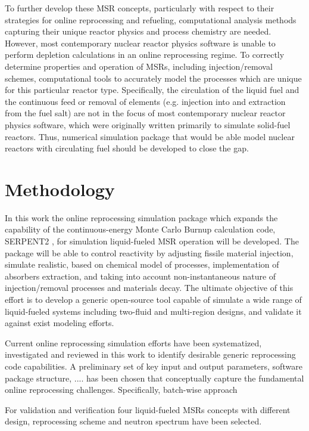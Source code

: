 To further develop these \gls{MSR} concepts, particularly with respect to their  
strategies for online reprocessing and refueling, computational analysis methods capturing their unique reactor physics and process chemistry are needed.
However, most contemporary nuclear reactor physics software is unable to 
perform depletion calculations in an online reprocessing regime. To correctly 
determine properties and operation of \glspl{MSR}, including injection/removal 
schemes, computational tools to accurately model the processes which are unique 
for this particular reactor type. Specifically, the circulation of the
liquid fuel and the continuous feed or removal of elements (e.g. injection into 
and extraction from the fuel salt) are not in the focus of most contemporary 
nuclear reactor physics software, which were originally written primarily to 
simulate solid-fuel reactors. Thus, numerical simulation package that would be 
able model nuclear reactors with circulating fuel should be developed to close 
the gap.


\section{Methodology}
In this work the online reprocessing simulation package which expands the capability of the continuous-energy Monte Carlo Burnup calculation code, SERPENT2 
\cite{leppanen_serpent_2015}, for simulation liquid-fueled \gls{MSR} operation 
will be developed. The package will 
be able to control reactivity by adjusting fissile material injection, simulate realistic, 
based on chemical model of processes, implementation of absorbers extraction, and 
taking into account non-instantaneous nature of injection/removal processes 
and materials decay. The ultimate 
objective of this effort is to develop a generic open-source tool capable of 
simulate a wide range of liquid-fueled systems including two-fluid and multi-region 
designs, and validate it against exist modeling efforts.

Current online reprocessing simulation efforts have been systematized, investigated and reviewed in this work to identify desirable generic reprocessing code capabilities. 
A preliminary set of key input and output parameters, software package structure, ....
 has been chosen that conceptually capture the fundamental online reprocessing  challenges. Specifically, batch-wise approach 
 
For validation and verification four liquid-fueled \glspl{MSR} concepts with different 
design, reprocessing scheme and neutron spectrum have been selected.